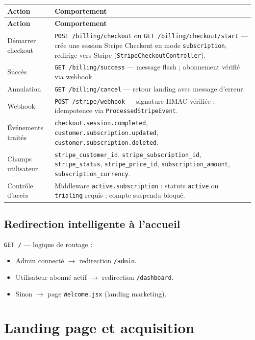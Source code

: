 \documentclass[11pt,a4paper]{report}
\newcommand{\route}[1]{\texttt{\small #1}}
\newcommand{\ctrl}[1]{\texttt{\small #1}}
\newcommand{\model}[1]{\texttt{\small #1}}
\begin{document}
\begin{longtable}{@{}p{3.5cm}p{10.2cm}@{}}
\toprule
\textbf{Action} & \textbf{Comportement} \\
\midrule
\endfirsthead
\toprule
\textbf{Action} & \textbf{Comportement} \\
\midrule
\endhead
Démarrer checkout & \route{POST /billing/checkout} ou \route{GET /billing/checkout/start} — crée une session Stripe Checkout en mode \texttt{subscription}, redirige vers Stripe (\ctrl{StripeCheckoutController}). \\
Succès & \route{GET /billing/success} — message flash ; abonnement vérifié via webhook. \\
Annulation & \route{GET /billing/cancel} — retour landing avec message d'erreur. \\
Webhook & \route{POST /stripe/webhook} — signature HMAC vérifiée ; idempotence via \model{ProcessedStripeEvent}. \\
Événements traités & \texttt{checkout.session.completed}, \texttt{customer.subscription.updated}, \texttt{customer.subscription.deleted}. \\
Champs utilisateur & \texttt{stripe\_customer\_id}, \texttt{stripe\_subscription\_id}, \texttt{stripe\_status}, \texttt{stripe\_price\_id}, \texttt{subscription\_amount}, \texttt{subscription\_currency}. \\
Contrôle d'accès & Middleware \texttt{active.subscription} : statuts \texttt{active} ou \texttt{trialing} requis ; compte suspendu bloqué. \\
\bottomrule
\end{longtable}

\section{Redirection intelligente à l'accueil}

\route{GET /} — logique de routage :
\begin{itemize}[leftmargin=*]
    \item Admin connecté $\rightarrow$ redirection \route{/admin}.
    \item Utilisateur abonné actif $\rightarrow$ redirection \route{/dashboard}.
    \item Sinon $\rightarrow$ page \texttt{Welcome.jsx} (landing marketing).
\end{itemize}

\chapter{Landing page et acquisition}
\end{document}

